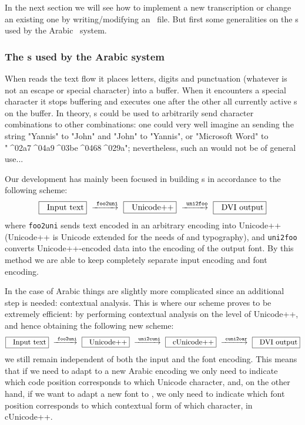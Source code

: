 \documentclass[a4paper,11pt]{article}
\begin{document}
In the next section we will see how to implement a new transcription
or change an existing one by writing/modifying an \OTP\ file. But
first some generalities on the \OTP{}s used by the Arabic \OMEGA\
system.

\subsubsection{The \OTP{}s used by the Arabic \OMEGA{} system}

When \OMEGA{} reads the text flow it places letters, digits and
punctuation (whatever is not an escape or special character) into a
buffer. When it encounters a special character it stops buffering and
executes one after the other all currently active \OTP{}s on the
buffer.  In theory, \OTP{}s could be used to arbitrarily send
character combinations to other combinations: one could very well
imagine an \OTP{} sending the string "Yannis" to "John" and "John" to
"Yannis", or "Microsoft Word" to
"^^^^02a7\kern-1pt^^^^04a9^^^^03be^^^^0468^^^^029a"; nevertheless,
such an \OTP{} would not be of general use...

Our development has mainly been focused in building \OTP{}s in
accordance to the following scheme:
$$
\boxed{\text{Input text}} \xrightarrow{\text{\texttt{foo2uni}}} \boxed{\text{Unicode++}} 
\xrightarrow{\text{\texttt{uni2foo}}} \boxed{\text{DVI output}} 
$$
where \texttt{foo2uni} sends text encoded in an arbitrary encoding
into Unicode++ (Unicode++ is Unicode extended for the needs of
\OMEGA{} and typography), and \texttt{uni2foo} converts
Unicode++-encoded data into the encoding of the output font. By this
method we are able to keep completely separate input encoding and font
encoding.

In the case of Arabic things are slightly more complicated since an
additional step is needed: contextual analysis. This is where our
scheme proves to be extremely efficient: by performing contextual
analysis on the level of Unicode++, and hence obtaining the following
new scheme:
$$
\boxed{\text{Input text}} \xrightarrow{\text{\texttt{foo2uni}}} \boxed{\text{Unicode++}} 
\xrightarrow{\text{\texttt{uni2cuni}}} \boxed{\text{cUnicode++}} 
\xrightarrow{\text{\texttt{cuni2oar}}} \boxed{\text{DVI output}}
$$
we still remain independent of both the input and the font
encoding. This means that if we need to adapt \OMEGA{} to a new Arabic
encoding we only need to indicate which code position corresponds to
which Unicode character, and, on the other hand, if we want to adapt a
new font to \OMEGA, we only need to indicate which font position
corresponds to which contextual form of which character, in
cUnicode++.
\end{document}
